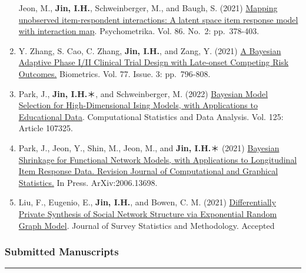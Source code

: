 \documentclass[
]{book}
\begin{document}
\begin{enumerate}
  Jeon, M., \textbf{Jin, I.H.}, Schweinberger, M., and Baugh, S. (2021) \href{https://arxiv.org/abs/2007.08719}{Mapping unobserved item-respondent interactions: A latent space item response model with interaction map}. Psychometrika. Vol. 86. No.~2: pp.~378-403.
\item
  Y. Zhang, S. Cao, C. Zhang, \textbf{Jin, I.H.}, and Zang, Y. (2021) \href{https://doi.org/10.1111/biom.13347}{A Bayesian Adaptive Phase I/II Clinical Trial Design with Late-onset Competing Risk Outcomes.} Biometrics. Vol. 77. Issue. 3: pp.~796-808.
\item
  Park, J., \textbf{Jin, I.H.}＊, and Schweinberger, M. (2022) \href{https://arxiv.org/abs/1911.07142}{Bayesian Model Selection for High-Dimensional Ising Models, with Applications to Educational Data}. Computational Statistics and Data Analysis. Vol. 125: Article 107325.
\item
  Park, J., Jeon, Y., Shin, M., Jeon, M., and \textbf{Jin, I.H.}＊ (2021) \href{https://arxiv.org/abs/2006.13698}{Bayesian Shrinkage for Functional Network Models, with Applications to Longitudinal Item Response Data. Revision Journal of Computational and Graphical Statistics.} In Press. ArXiv:2006.13698.
\item
  Liu, F., Eugenio, E., \textbf{Jin, I.H.}, and Bowen, C. M. (2021) \href{https://www.osti.gov/biblio/1668697}{Differentially Private Synthesis of Social Network Structure via Exponential Random Graph Model}. Journal of Survey Statistics and Methodology. Accepted
\end{enumerate}

\hypertarget{submitted-manuscripts}{%
\subsubsection*{Submitted Manuscripts}\label{submitted-manuscripts}}

\begin{center}\rule{0.5\linewidth}{0.5pt}\end{center}
\end{document}
